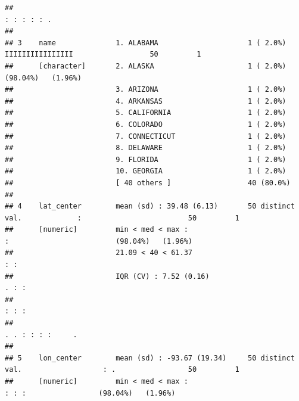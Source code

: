 \documentclass[]{article}
\begin{document}
\begin{verbatim}
##                                                                            : : : : : .                                           
## 
## 3    name              1. ALABAMA                     1 ( 2.0%)            IIIIIIIIIIIIIIII                  50         1        
##      [character]       2. ALASKA                      1 ( 2.0%)                                              (98.04%)   (1.96%)  
##                        3. ARIZONA                     1 ( 2.0%)                                                                  
##                        4. ARKANSAS                    1 ( 2.0%)                                                                  
##                        5. CALIFORNIA                  1 ( 2.0%)                                                                  
##                        6. COLORADO                    1 ( 2.0%)                                                                  
##                        7. CONNECTICUT                 1 ( 2.0%)                                                                  
##                        8. DELAWARE                    1 ( 2.0%)                                                                  
##                        9. FLORIDA                     1 ( 2.0%)                                                                  
##                        10. GEORGIA                    1 ( 2.0%)                                                                  
##                        [ 40 others ]                  40 (80.0%)                                                                 
## 
## 4    lat_center        mean (sd) : 39.48 (6.13)       50 distinct val.             :                         50         1        
##      [numeric]         min < med < max :                                           :                         (98.04%)   (1.96%)  
##                        21.09 < 40 < 61.37                                        : :                                             
##                        IQR (CV) : 7.52 (0.16)                                  . : :                                             
##                                                                                : : :                                             
##                                                                            . . : : : :     .                                     
## 
## 5    lon_center        mean (sd) : -93.67 (19.34)     50 distinct val.                   : .                 50         1        
##      [numeric]         min < med < max :                                               : : :                 (98.04%)   (1.96%)  

\end{verbatim}
\end{document}
